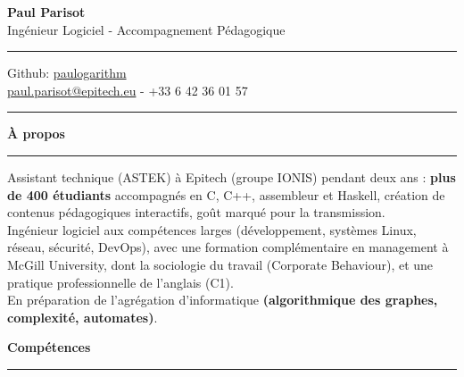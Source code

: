 \documentclass[9pt]{extarticle}
\begin{document}
\begin{center}
	{\huge\bfseries Paul Parisot}
	\\[4pt]
	{\Large Ingénieur Logiciel - Accompagnement Pédagogique}
	\\
\end{center}


\par\vspace{-5pt}
\rule{\linewidth}{0.4pt}
\par\vspace{-5pt}

\begin{center}
	Github: \href{https://github.com/paulogarithm}{paulogarithm}
	\\
	\href{mailto:paul.parisot@epitech.eu}{paul.parisot@epitech.eu} - +33 6 42 36 01 57
	\\
\end{center}

\par\vspace{-10pt}
\rule{\linewidth}{0.4pt}
\par\vspace{7pt}


{\large\bfseries À propos}
\par\vspace{-8pt}
\rule{\linewidth}{0.4pt}
\par\vspace{5pt}

Assistant technique (ASTEK) à Epitech (groupe IONIS) pendant deux ans : {\bfseries plus de 400 étudiants} accompagnés en C, C++, assembleur et Haskell, création de contenus pédagogiques interactifs, goût marqué pour la transmission.
\\
Ingénieur logiciel aux compétences larges (développement, systèmes Linux, réseau, sécurité, DevOps), avec une formation complémentaire en management à McGill University, dont la sociologie du travail (Corporate Behaviour), et une pratique professionnelle de l'anglais (C1).
\\
En préparation de l'agrégation d'informatique {\bfseries (algorithmique des graphes, complexité, automates)}.
\par\vspace{5pt}


{\large\bfseries Compétences}
\par\vspace{-8pt}
\rule{\linewidth}{0.4pt}
\par\vspace{5pt}
\end{document}

